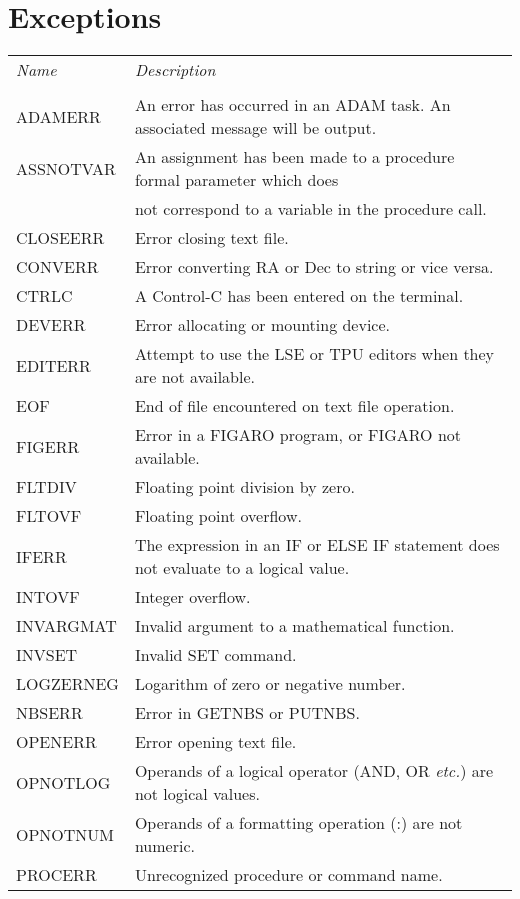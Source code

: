 \section{Exceptions}

\begin{center}
\begin{tabular}{ll}
{\em Name} & {\em Description} \\
\\
ADAMERR  &  An error has occurred in an ADAM task. An associated message will
   be output. \\
ASSNOTVAR  &  An assignment has been made to a procedure formal parameter
   which does \\
   & not correspond to a variable in the procedure call. \\
CLOSEERR  &  Error closing text file. \\
CONVERR  &  Error converting RA or Dec to string or vice versa. \\
CTRLC  &  A Control-C has been entered on the terminal.\\
DEVERR  &  Error allocating or mounting device.\\
EDITERR  &  Attempt to use the LSE or TPU editors when they are not available.\\
EOF & End of file encountered on text file operation. \\
FIGERR  &  Error in a FIGARO program, or FIGARO not available. \\
FLTDIV  &  Floating point division by zero. \\
FLTOVF  &  Floating point overflow. \\
IFERR  &  The expression in an IF or ELSE IF statement does not evaluate to a
  logical value. \\
INTOVF  &  Integer overflow. \\
INVARGMAT  &  Invalid argument to a mathematical function.  \\
INVSET  &  Invalid SET command.  \\
LOGZERNEG  &  Logarithm of zero or negative number.  \\
NBSERR  &  Error in GETNBS or PUTNBS. \\
OPENERR  &  Error opening text file. \\
OPNOTLOG  &  Operands of a logical operator (AND, OR {\em etc.}) are not
   logical values.  \\
OPNOTNUM  &  Operands of a formatting operation (:) are not numeric. \\
PROCERR  &  Unrecognized procedure or command name.  \\

\end{tabular}
\end{center}
